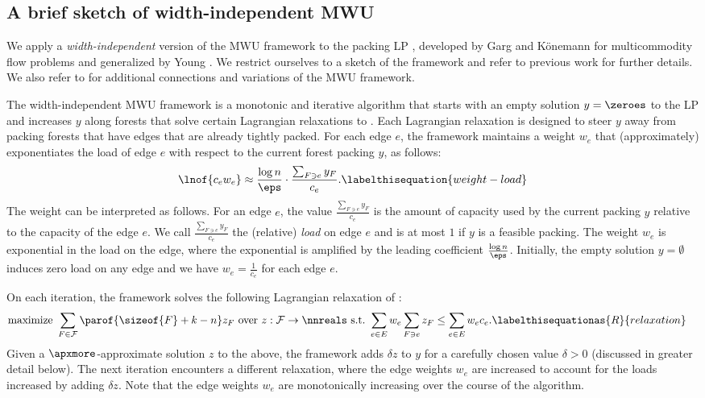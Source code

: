 \documentclass[11pt]{article}
\numberwithin{equation}{section}
\theoremstyle{definition}
\theoremstyle{plain}
\newcommand{\costof}[1]{c_{#1}}
\newcommand{\capacityof}{\costof}%
\newcommand{\forests}{\mathcal{F}} %
\newcommand{\weight}[1]{w_{#1}}
\newcommand{\wrt}{with respect to\xspace} %
\begin{document}
\subsection{A brief sketch of width-independent MWU}


We apply a \emph{width-independent} version of the MWU framework to
the packing LP , developed by Garg and
%
K\"onemann %
\cite{gk-07} for multicommodity flow problems and generalized by Young
\cite{young-01}. We restrict ourselves to a sketch of the framework
and refer to previous work for further details. %
We also refer to \cite{AHK} for additional connections and variations
of the MWU framework. %

The width-independent MWU framework is a monotonic and iterative
algorithm that starts with an empty solution $y = \zeroes$ to the LP
 and increases $y$ along forests that
solve certain Lagrangian relaxations to
. Each Lagrangian relaxation is designed
to steer $y$ away from packing forests that have edges that are
already tightly packed. For each edge $e$, the framework maintains a
weight $\weight{e}$ that (approximately) exponentiates the load of
edge $e$ \wrt the current forest packing $y$, as follows:
\begin{align*}
  \lnof{\capacityof{e} \weight{e}}  %
  \approx %
  \frac{\log n}{\eps}\cdot \frac{\sum_{F \ni e} y_F}{\capacityof{e}}. %
  \labelthisequation{weight-load}
\end{align*}
The weight can be interpreted as follows.  For an edge $e$, the value
$\frac{\sum_{F \ni e} y_F}{\capacityof{e}}$ is the amount of capacity
used by the current packing $y$ relative to the capacity of the edge
$e$. We call $\frac{\sum_{F \ni e} y_F}{\capacityof{e}}$ the
(relative) \emph{load} on edge $e$ and is at most $1$ if $y$ is a
feasible packing. The weight $\weight{e}$ is exponential in the load
on the edge, where the exponential is amplified by the leading
coefficient $\frac{\log n}{\eps}$.  Initially, the empty solution
$y = \emptyset$ induces zero load on any edge and we have
$\weight{e} = \frac{1}{\capacityof{e}}$ for each edge $e$.

On each iteration, the framework solves the following Lagrangian
relaxation of :
\begin{align*}
  \text{maximize }              %
  & \sum_{F \in \forests} \parof{\sizeof{F} + k - n}
    z_F \text{ over } z: \forests \to \nnreals %
    \text{ s.t.\ }
    \sum_{e \in E} \weight{e} \sum_{F \ni e} z_F %
    \leq                                         %
    \sum_{e \in E} \weight{e} \capacityof{e}.
    \labelthisequationas{R}{relaxation}
\end{align*}
Given a $\apxmore$-approximate solution $z$ to the above, the
framework adds $\delta z$ to $y$ for a carefully chosen value
$\delta > 0$ (discussed in greater detail below). The next iteration
encounters a different relaxation, where the edge weights $\weight{e}$
are increased to account for the loads increased by adding
$\delta z$. Note that the edge weights $\weight{e}$ are monotonically
increasing over the course of the algorithm.
\end{document}
